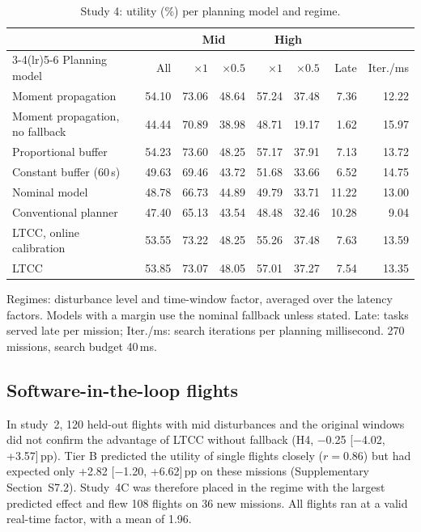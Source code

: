 \documentclass[a4paper,fleqn]{cas-dc}
\newcommand{\mname}{LTCC}  %
\newcommand{\uprighttext}{\def\textbf##1{##1}\def\textit##1{##1}}
\newcounter{prop}
\begin{document}
\begingroup\uprighttext
\begin{table}[t]
\caption{Study 4: utility (\%) per planning model and regime.}\label{tab:s4}
\centering\small
\begin{threeparttable}
\begin{tabular}{lrrrrrrr}
\toprule
& & \multicolumn{2}{c}{Mid} & \multicolumn{2}{c}{High} & & \\
\cmidrule(lr){3-4}\cmidrule(lr){5-6}
Planning model & All & $\times 1$ & $\times 0.5$ & $\times 1$ & $\times 0.5$ & Late & Iter./ms \\
\midrule
Moment propagation & 54.10 & 73.06 & 48.64 & 57.24 & 37.48 & 7.36 & 12.22 \\
Moment propagation, no fallback & 44.44 & 70.89 & 38.98 & 48.71 & 19.17 & 1.62 & 15.97 \\
Proportional buffer & 54.23 & 73.60 & 48.25 & 57.17 & 37.91 & 7.13 & 13.72 \\
Constant buffer (60\,s) & 49.63 & 69.46 & 43.72 & 51.68 & 33.66 & 6.52 & 14.75 \\
Nominal model & 48.78 & 66.73 & 44.89 & 49.79 & 33.71 & 11.22 & 13.00 \\
Conventional planner & 47.40 & 65.13 & 43.54 & 48.48 & 32.46 & 10.28 & 9.04 \\
\mname{}, online calibration & 53.55 & 73.22 & 48.25 & 55.26 & 37.48 & 7.63 & 13.59 \\
\mname{} & 53.85 & 73.07 & 48.05 & 57.01 & 37.27 & 7.54 & 13.35 \\
\bottomrule
\end{tabular}
\begin{tablenotes}[flushleft]\scriptsize
\item[] Regimes: disturbance level and time-window factor, averaged over the latency factors. Models with a margin use the nominal fallback unless stated. Late: tasks served late per mission; Iter./ms: search iterations per planning millisecond. 270 missions, search budget 40\,ms.
\end{tablenotes}
\end{threeparttable}
\end{table}
\endgroup

\subsection{Software-in-the-loop flights}\label{sec:s2-tierc}
In study~2, 120 held-out flights with mid disturbances and the original windows did not confirm the advantage
of \mname{} without fallback (H4, $-$0.25 [$-$4.02, +3.57]\,pp). Tier B predicted the utility of single flights closely
($r={}$0.86) but had expected only +2.82 [$-$1.20, +6.62]\,pp on these missions (Supplementary
Section~S7.2). Study~4C was therefore placed in the regime with the largest predicted effect and flew
108 flights on 36 new missions. All flights ran at a valid real-time factor, with a mean of
1.96.
\end{document}
